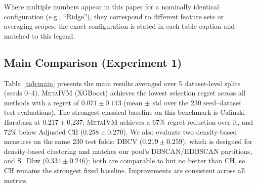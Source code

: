 \documentclass[10pt]{article} %
\newcommand{\ours}{\textsc{MetaIVM}}
\begin{document}
Where multiple numbers appear in this paper for a nominally identical configuration (e.g., ``Ridge''), they correspond to different feature sets or averaging scopes; the exact configuration is stated in each table caption and matched to this legend.

\subsection{Main Comparison (Experiment 1)}

Table~\ref{tab:main} presents the main results averaged over 5 dataset-level splits (seeds 0--4). \ours{} (XGBoost) achieves the lowest selection regret across all methods with a regret of $0.071 \pm 0.113$ (mean $\pm$ std over the 230 seed--dataset test evaluations). The strongest classical baseline on this benchmark is Calinski-Harabasz at $0.217 \pm 0.237$; \ours{} achieves a 67\% regret reduction over it, and 72\% below Adjusted CH \citep{jeon2025measuring} ($0.258 \pm 0.270$). We also evaluate two density-based measures on the same 230 test folds: DBCV \citep{moulavi2014dbcv} ($0.219 \pm 0.259$), which is designed for density-based clustering and matches our pool's DBSCAN/HDBSCAN partitions, and S\_Dbw ($0.334 \pm 0.246$); both are comparable to but no better than CH, so CH remains the strongest fixed baseline. Improvements are consistent across all metrics.
\end{document}
